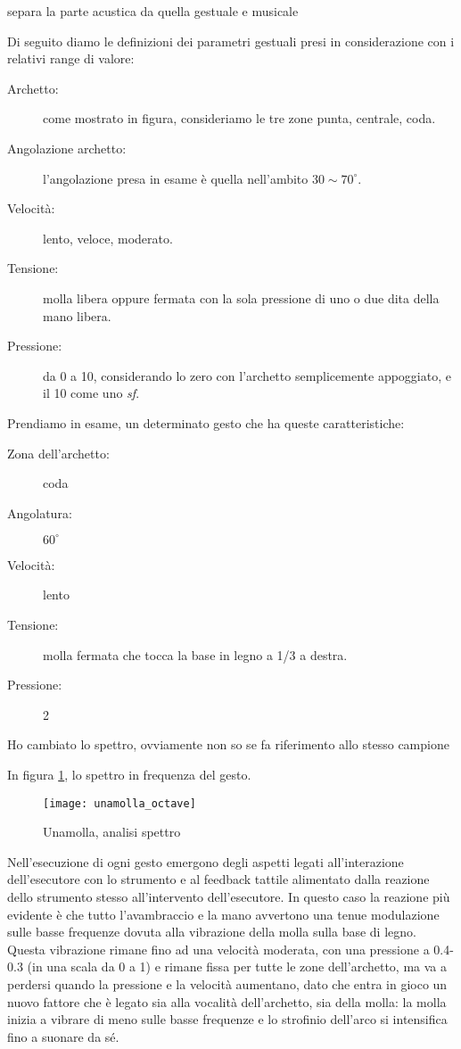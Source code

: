 \Large{\color{red} separa la parte acustica da quella gestuale e musicale}

Di seguito diamo le definizioni dei parametri gestuali presi in considerazione
con i relativi range di valore:

\begin{description}
  \item[Archetto:] come mostrato in figura, consideriamo le tre zone punta, centrale, coda.
  \item[Angolazione archetto:] l’angolazione presa in esame è quella nell'ambito $30\sim70^\circ$.
  \item[Velocità:] lento, veloce, moderato.
  \item[Tensione:] molla libera oppure fermata con la sola pressione di uno o due dita della mano libera.
  \item[Pressione:] da 0 a 10, considerando lo zero con l’archetto semplicemente appoggiato, e il 10 come uno \textit{sf}.
\end{description}

Prendiamo in esame, un determinato gesto che ha queste caratteristiche:
\begin{description}
  \item[Zona dell’archetto:] coda
  \item[Angolatura:] $60^\circ$
  \item[Velocità:] lento
  \item[Tensione:] molla fermata che tocca la base in legno a 1/3 a destra.
  \item[Pressione:] 2
\end{description}

\Large{\color{red}Ho cambiato lo spettro, ovviamente non so se fa riferimento allo stesso campione}

In figura \ref{fig:04_spettro_01}, lo spettro in frequenza del gesto.

\begin{figure}[h]
\centering
\texttt{[image: unamolla\_octave]}
\caption{Unamolla, analisi spettro}
\label{fig:04_spettro_01}
\end{figure}

Nell’esecuzione di ogni gesto emergono degli aspetti legati all’interazione
dell’esecutore con lo strumento e al feedback tattile alimentato dalla reazione
dello strumento stesso all’intervento dell’esecutore. In questo caso la reazione
più evidente è che tutto l’avambraccio e la mano avvertono una tenue modulazione
sulle basse frequenze dovuta alla vibrazione della molla sulla base di legno.
Questa vibrazione rimane fino ad una velocità moderata, con una pressione a
0.4-0.3 (in una scala da 0 a 1) e rimane fissa per tutte le zone dell’archetto,
ma va a perdersi quando la pressione e la velocità aumentano, dato che entra in
gioco un nuovo fattore che è legato sia alla vocalità dell’archetto, sia della
molla: la molla inizia a vibrare di meno sulle basse frequenze e lo strofinio
dell’arco si intensifica fino a suonare da sé.

